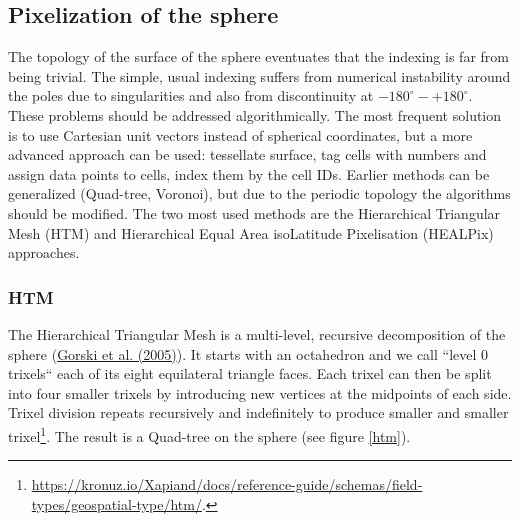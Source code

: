 \documentclass[12pt]{article}
\theoremstyle{plain}
\begin{document}




\subsection{Pixelization of the sphere}

The topology of the surface of the sphere eventuates that the indexing is far from being trivial. The simple, usual indexing suffers from numerical instability around the poles due to singularities and also from discontinuity at $- 180^\circ - + 180^\circ$. These problems should be addressed algorithmically. The most frequent solution is to use Cartesian unit vectors instead of spherical coordinates, but a more advanced approach can be used: tessellate surface, tag cells with numbers and assign data points to cells, index them by the cell IDs. Earlier methods can be generalized (Quad-tree, Voronoi), but due to the periodic topology the algorithms should be modified. The two most used methods are the Hierarchical Triangular Mesh (HTM) and Hierarchical Equal Area isoLatitude Pixelisation (HEALPix) approaches. 

\subsubsection{HTM}

The Hierarchical Triangular Mesh is a multi-level, recursive decomposition of the sphere (\hyperlink{Gorski et al. (2005)}{Gorski et al. (2005)}). It starts with an octahedron and we call “level 0 trixels“ each of its eight equilateral triangle faces. Each trixel can then be split into four smaller trixels by introducing new vertices at the midpoints of each side. Trixel division repeats recursively and indefinitely to produce smaller and smaller trixel\footnote{\url{https://kronuz.io/Xapiand/docs/reference-guide/schemas/field-types/geospatial-type/htm/}.}. The result is a Quad-tree on the sphere (see figure \ref{htm}).
\end{document}
